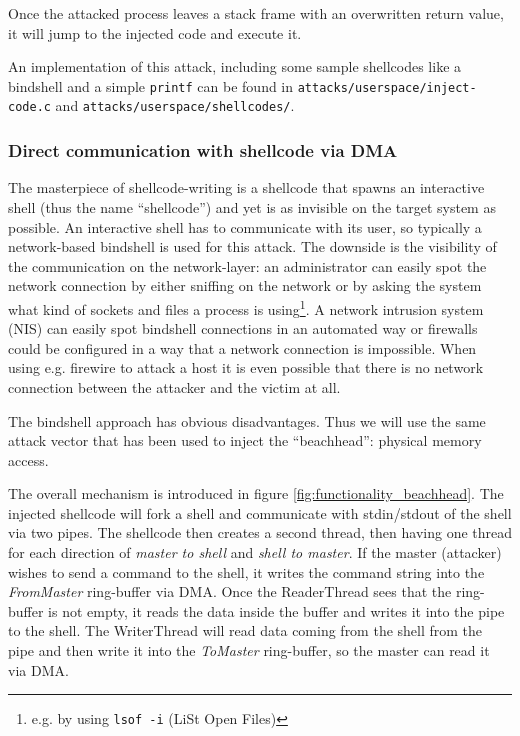 Once the attacked process leaves a stack frame with an overwritten return value,
it will jump to the injected code and execute it.

An implementation of this attack, including some sample shellcodes like a
bindshell and a simple \texttt{printf} can be found in
\texttt{attacks/userspace/inject-code.c} and \linebreak
\texttt{attacks/userspace/shellcodes/}.


\subsubsection{Direct communication with shellcode via DMA}


\label{communication_DMA} The masterpiece of shellcode-writing is a shellcode
that spawns an interactive shell (thus the name ``shellcode'') and yet is as
invisible on the target system as possible.  An interactive shell has to
communicate with its user, so typically a network-based bindshell is used for
this attack. The downside is the visibility of the communication on the
network-layer: an administrator can easily spot the network connection by either
sniffing on the network or by asking the system what kind of sockets and files a
process is using\footnote{e.g. by using \texttt{lsof -i} (LiSt Open Files)}. A
network intrusion system (NIS) can easily spot bindshell connections in an
automated way or firewalls could be configured in a way that a network
connection is impossible. When using e.g. firewire to attack a host it is even
possible that there is no network connection between the attacker and the victim
at all.

The bindshell approach has obvious disadvantages. Thus we will use the same
attack vector that has been used to inject the ``beachhead'': physical memory
access.

The overall mechanism is introduced in figure \ref{fig:functionality_beachhead}.
The injected shellcode will fork a shell and communicate with stdin/stdout of
the shell via two pipes. The shellcode then creates a second thread, then having
one thread for each direction of \emph{master to shell} and \emph{shell to
master}. If the master (attacker) wishes to send a command to the shell, it
writes the command string into the \emph{FromMaster} ring-buffer via DMA.  Once
the ReaderThread sees that the ring-buffer is not empty, it reads the data
inside the buffer and writes it into the pipe to the shell.  The WriterThread
will read data coming from the shell from the pipe and then write it into the
\emph{ToMaster} ring-buffer, so the master can read it via DMA.

